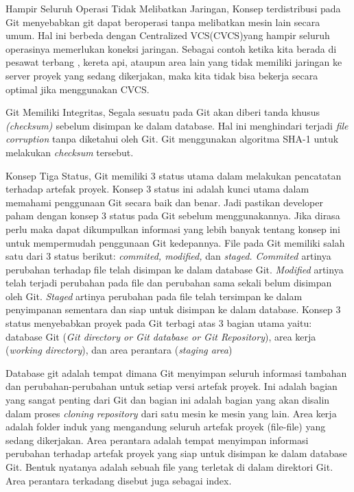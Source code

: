 \noindent 
Hampir Seluruh Operasi Tidak Melibatkan Jaringan, Konsep terdistribusi pada Git menyebabkan git dapat beroperasi tanpa melibatkan mesin lain secara umum. Hal ini berbeda dengan Centralized VCS(CVCS)yang hampir seluruh operasinya memerlukan koneksi jaringan. Sebagai contoh ketika kita berada di pesawat terbang , kereta api, ataupun area lain yang tidak memiliki jaringan ke server proyek yang sedang dikerjakan, maka kita tidak bisa bekerja secara optimal jika menggunakan CVCS. \par
\noindent 
Git Memiliki Integritas, Segala sesuatu pada Git akan diberi tanda khusus \textit{(checksum) $  $}sebelum disimpan ke dalam database. Hal ini menghindari terjadi\textit{ file corruption} tanpa diketahui oleh Git. Git menggunakan algoritma SHA-1 untuk melakukan \textit{checksum} tersebut. \par
\noindent 
Konsep Tiga Status, $  $Git memiliki 3 status utama dalam melakukan pencatatan terhadap artefak proyek. Konsep 3 status ini adalah kunci utama dalam memahami penggunaan Git secara baik dan benar. Jadi pastikan developer paham dengan konsep 3 status pada Git sebelum menggunakannya. Jika dirasa perlu maka dapat dikumpulkan informasi yang lebih banyak tentang konsep ini untuk mempermudah penggunaan Git kedepannya. File pada Git memiliki salah satu dari 3 status berikut: \textit{commited, modified,} dan \textit{staged. Commited $  $}artinya perubahan terhadap file telah disimpan ke dalam database Git. \textit{Modified} artinya telah terjadi perubahan pada file dan perubahan sama sekali belum disimpan oleh Git. \textit{Staged} artinya perubahan pada file telah tersimpan ke dalam penyimpanan sementara dan siap untuk disimpan ke dalam database. Konsep 3 status menyebabkan proyek pada Git terbagi atas 3 bagian utama yaitu: database Git (\textit{Git directory or Git database or Git Repository}), area kerja (\textit{working directory}), dan area perantara (\textit{staging area})  \par
\noindent 
Database git adalah tempat dimana Git menyimpan seluruh informasi tambahan dan perubahan-perubahan untuk setiap versi artefak proyek. Ini adalah bagian yang sangat penting dari Git dan bagian ini adalah bagian yang akan disalin dalam proses \textit{cloning repository $  $}dari satu mesin ke mesin yang lain. Area kerja adalah folder induk yang mengandung seluruh artefak proyek (file-file) yang sedang dikerjakan. Area perantara adalah tempat menyimpan informasi perubahan terhadap artefak proyek yang siap untuk disimpan ke dalam database Git. Bentuk nyatanya adalah sebuah file yang terletak di dalam direktori Git. Area perantara terkadang disebut juga sebagai index.\vspace{\baselineskip}
